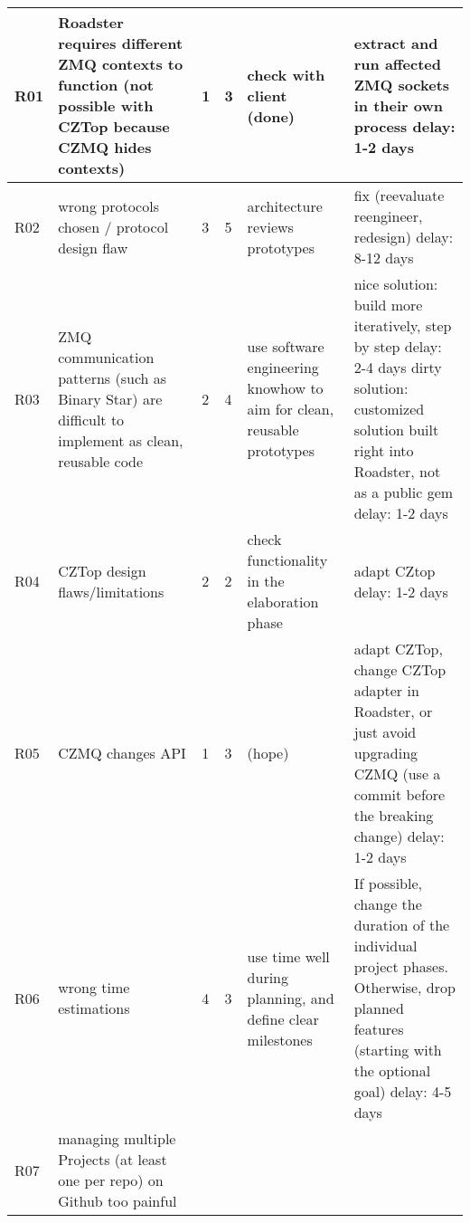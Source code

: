 \begin{center}
\begin{longtable}{|p{6mm}|p{30mm}|p{6mm}|p{8mm}|p{30mm}|p{64mm}|}
    \hline
    \endlastfoot
    R01
		& Roadster requires different ZMQ contexts to function (not possible with CZTop because CZMQ hides contexts)
		& \cellcolor{green!50}1
		& \cellcolor{green!50}3
		& check with client	(done)
		& extract and run affected ZMQ \newline sockets in their own process \newline delay: 1-2 days \\ \hline
	R02 
		& wrong protocols chosen / protocol design flaw
		& \cellcolor{orange!50}3
		& \cellcolor{orange!50}5
		& architecture \newline reviews prototypes
		& fix (reevaluate reengineer, redesign) \newline delay: 8-12 days	\\ \hline
	R03 
		& ZMQ communication patterns (such as Binary Star) are difficult to implement as clean, reusable code
		& \cellcolor{yellow!50}2 
		& \cellcolor{yellow!50}4 
		& use software engineering knowhow to aim for clean, reusable prototypes
		& nice solution: \newline build more iteratively, step by step \newline delay: 2-4 days \newline \newline dirty solution: 
		\newline customized solution built right into Roadster, not as a public gem \newline delay: 1-2 days \\ \hline
	R04	
		& CZTop design flaws/limitations
		& \cellcolor{green!50}2
		& \cellcolor{green!50}2
		& check functionality in the elaboration phase
		& adapt CZtop \newline delay: 1-2 days \\ \hline		
	R05 
		& CZMQ changes API
		& \cellcolor{green!50}1
		& \cellcolor{green!50}3
		& (hope)
		& adapt CZTop, change CZTop adapter in Roadster, or just avoid upgrading CZMQ (use a commit before the breaking change) \newline delay: 1-2 days \\ \hline
	R06 
		& wrong time estimations
		& \cellcolor{yellow!50}4
		& \cellcolor{yellow!50}3
		& use time well during planning, and define clear milestones
		& If possible, change the duration of the individual project phases. Otherwise, drop planned features
		(starting with the optional goal) \newline delay: 4-5 days \\ \hline		
	R07 
		& managing multiple Projects (at least one per repo) on Github too painful

\end{longtable}
\end{center}
